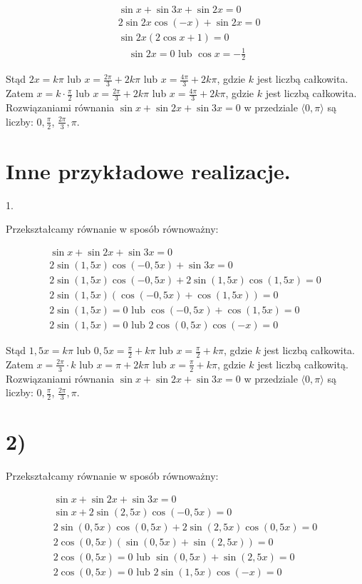 \documentclass[10pt]{article}
\begin{document}
$$
\begin{aligned}
& \sin x+\sin 3 x+\sin 2 x=0 \\
& 2 \sin 2 x \cos (-x)+\sin 2 x=0 \\
& \sin 2 x(2 \cos x+1)=0 \\
& \quad \sin 2 x=0 \text { lub } \cos x=-\frac{1}{2}
\end{aligned}
$$

Stąd $2 x=k \pi$ lub $x=\frac{2 \pi}{3}+2 k \pi$ lub $x=\frac{4 \pi}{3}+2 k \pi$, gdzie $k$ jest liczbą całkowita. Zatem $x=k \cdot \frac{\pi}{2}$ lub $x=\frac{2 \pi}{3}+2 k \pi$ lub $x=\frac{4 \pi}{3}+2 k \pi$, gdzie $k$ jest liczbą całkowita. Rozwiązaniami równania $\sin x+\sin 2 x+\sin 3 x=0$ w przedziale $\langle 0, \pi\rangle$ są liczby: $0, \frac{\pi}{2}$, $\frac{2 \pi}{3}, \pi$.

\section*{Inne przykładowe realizacje.}
1.

Przekształcamy równanie w sposób równoważny:

$$
\begin{gathered}
\sin x+\sin 2 x+\sin 3 x=0 \\
2 \sin (1,5 x) \cos (-0,5 x)+\sin 3 x=0 \\
2 \sin (1,5 x) \cos (-0,5 x)+2 \sin (1,5 x) \cos (1,5 x)=0 \\
2 \sin (1,5 x)(\cos (-0,5 x)+\cos (1,5 x))=0 \\
2 \sin (1,5 x)=0 \text { lub } \cos (-0,5 x)+\cos (1,5 x)=0 \\
2 \sin (1,5 x)=0 \text { lub } 2 \cos (0,5 x) \cos (-x)=0
\end{gathered}
$$

Stąd $1,5 x=k \pi$ lub $0,5 x=\frac{\pi}{2}+k \pi$ lub $x=\frac{\pi}{2}+k \pi$, gdzie $k$ jest liczbą całkowita. Zatem $x=\frac{2 \pi}{3} \cdot k$ lub $x=\pi+2 k \pi$ lub $x=\frac{\pi}{2}+k \pi$, gdzie $k$ jest liczbą całkowitą. Rozwiązaniami równania $\sin x+\sin 2 x+\sin 3 x=0$ w przedziale $\langle 0, \pi\rangle$ są liczby: $0, \frac{\pi}{2}$, $\frac{2 \pi}{3}, \pi$.

\section*{2)}
Przekształcamy równanie w sposób równoważny:

$$
\begin{gathered}
\sin x+\sin 2 x+\sin 3 x=0 \\
\sin x+2 \sin (2,5 x) \cos (-0,5 x)=0 \\
2 \sin (0,5 x) \cos (0,5 x)+2 \sin (2,5 x) \cos (0,5 x)=0 \\
2 \cos (0,5 x)(\sin (0,5 x)+\sin (2,5 x))=0 \\
2 \cos (0,5 x)=0 \text { lub } \sin (0,5 x)+\sin (2,5 x)=0 \\
2 \cos (0,5 x)=0 \text { lub } 2 \sin (1,5 x) \cos (-x)=0
\end{gathered}
$$
\end{document}
